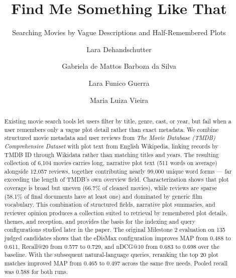 \documentclass[sigconf]{acmart}
\begin{document}
\title{Find Me Something Like That}
\subtitle{Searching Movies by Vague Descriptions and Half-Remembered Plots}

\author{Lara Dehandschutter}

\author{Gabriela de Mattos Barboza da Silva}

\author{Lara Funico Guerra}

\author{Maria Luiza Vieira}
\renewcommand{\shortauthors}{Dehandschutter et al.}

\begin{abstract}
Existing movie search tools let users filter by title, genre, cast, or year, but fail
when a user remembers only a vague plot detail rather than exact metadata. We combine
structured movie metadata and user reviews from \textit{The Movie Database (TMDB)
Comprehensive Dataset} with plot text from English Wikipedia, linking records by TMDB
ID through Wikidata rather than matching titles and years. The resulting collection of
6{,}104 movies carries long, narrative plot text (511 words on average) alongside
12{,}057 reviews, together contributing nearly 99{,}000 unique word forms --- far
exceeding the length of TMDB's own overview field. Characterization shows that plot
coverage is broad but uneven (66.7\% of cleaned movies), while reviews are sparse
(58.1\% of final documents have at least one) and dominated by generic film vocabulary.
This combination of structured fields, narrative plot summaries, and reviewer opinion
produces a collection suited to retrieval by remembered plot details, themes, and
reception, and provides the basis for the indexing and query configurations studied
later in the paper. The original Milestone 2 evaluation on 135 judged candidates shows that the
eDisMax configuration improves MAP from 0.488 to 0.611, Recall@20 from 0.577 to
0.729, and nDCG@10 from 0.683 to 0.698 over the baseline. With the subsequent
natural-language queries, reranking the top 20 plot matches improved MAP from
0.465 to 0.497 across the same five needs. Pooled recall was 0.588 for both runs.
\end{abstract}

\end{document}
